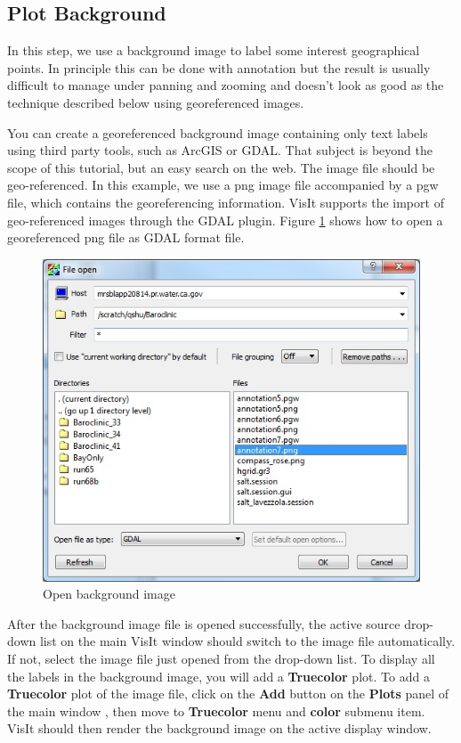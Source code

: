 \documentclass[12pt]{report}
\begin{document}
			
			\subsection{Plot Background}
			
In this step, we use a background image to label some interest geographical points. In principle this can be done with
annotation but the result is usually difficult to manage under panning and zooming and doesn't look as good as the technique
described below using georeferenced images.
			
You can create a georeferenced background image containing only text labels using third party tools, such as ArcGIS or GDAL. That subject is beyond the scope of this tutorial, but an easy search on the web. The image file  should be geo-referenced. In this example, we use a png image file accompanied by a pgw file, which contains the georeferencing information. 
VisIt supports the import of geo-referenced images through the GDAL plugin. 
Figure \ref{figure:openGeoPng} shows how to open a georeferenced png file as GDAL format file. 
						
\begin{figure}
\begin{center}
\includegraphics{openGeoPng}
\caption{Open background image}
\label{figure:openGeoPng}
\end{center}
\end{figure} 
				
After the background image file is opened successfully, the active source drop-down list on the main  VisIt window should switch to the image file automatically. 
If not, select the image file just opened from the drop-down list. To display all 
the labels in the background image, you will add a {\bf Truecolor} plot. To add a {\bf Truecolor} plot of the image file,
click on the {\bf Add} button on the {\bf Plots} panel of the main window , then move to {\bf Truecolor} menu and 
{\bf color} submenu item. VisIt should then render the background image on the active display window.
				
\end{document}

